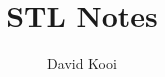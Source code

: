 \documentclass{article}
\title{STL Notes}
\author{David Kooi}
\theoremstyle{definition}
\begin{document}
\maketitle

\end{document}
